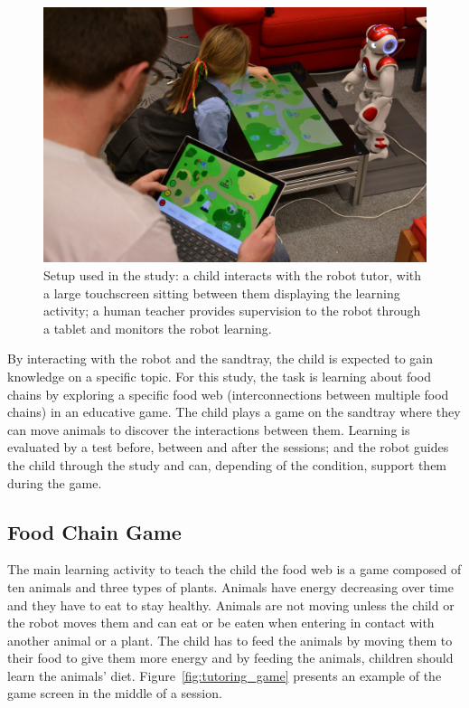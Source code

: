\begin{figure}[ht]
	\centering
	\includegraphics[width=.5\textwidth]{setup.jpg}
	\caption{Setup used in the study: a child interacts with the robot tutor, with a large touchscreen sitting between them displaying the learning activity; a human teacher provides supervision to the robot through a tablet and monitors the robot learning.}
	\label{fig:tutoring_setup}
\end{figure}

By interacting with the robot and the sandtray, the child is expected to gain knowledge on a specific topic. For this study, the task is learning about food chains by exploring a specific food web (interconnections between multiple food chains) in an educative game. The child plays a game on the sandtray where they can move animals to discover the interactions between them. Learning is evaluated by a test before, between and after the sessions; and the robot guides the child through the study and can, depending of the condition, support them during the game.

\subsection{Food Chain Game}

The main learning activity to teach the child the food web is a game composed of ten animals and three types of plants. Animals have energy decreasing over time and they have to eat to stay healthy. Animals are not moving unless the child or the robot moves them and can eat or be eaten when entering in contact with another animal or a plant. The child has to feed the animals by moving them to their food to give them more energy and by feeding the animals, children should learn the animals' diet. Figure~\ref{fig:tutoring_game} presents an example of the game screen in the middle of a session.

